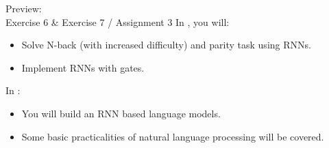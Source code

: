 %
%


\begin{frame}{Preview:\\ Exercise 6 \& Exercise 7 / Assignment 3}
	In , you will:
	\begin{itemize}
		\item Solve N-back (with increased difficulty) and parity task using RNNs.
		\item Implement RNNs with gates.
	\end{itemize}
\vsp
	In :
\begin{itemize}
	\item You will build an RNN based language models.
	\item Some basic practicalities of natural language processing will be covered. 
\end{itemize}
\end{frame}

